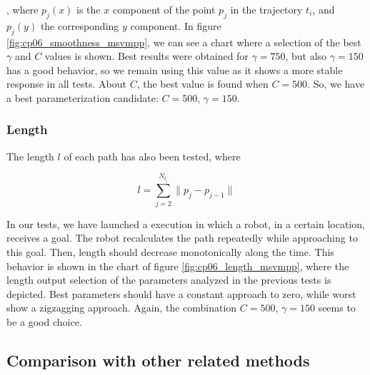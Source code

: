 , where $p_j(x)$ is the $x$ component of the point $p_j$ in the trajectory $t_i$, and $p_j(y)$ the corresponding $y$ component. In figure \ref{fig:cp06_smoothness_msvmpp}, we can see a chart where a selection of the best $\gamma$ and $C$ values is shown. Best results were obtained for $\gamma=750$, but also $\gamma=150$ has a good behavior, so we remain using this value as it shows a more stable response in all tests. About $C$, the best value is found when $C=500$. So, we have a best parameterization candidate: $C=500$, $\gamma=150$.

\subsubsection{Length}\label{ch:chapter06_02_01_03}

The length $l$ of each path has also been tested, where

\begin{equation}\label{eq:cp06_length}
  l = \sum_{j=2}^{N_{t_i}} \| p_j - p_{j - 1}\|
\end{equation}

In our tests, we have launched a execution in which a robot, in a certain location, receives a goal. The robot recalculates the path repeatedly while approaching to this goal. Then, length should decrease monotonically along the time. This behavior is shown in the chart of figure \ref{fig:cp06_length_msvmpp}, where the length output selection of the parameters analyzed in the previous tests is depicted. Best parameters should have a constant approach to zero, while worst show a zigzagging approach. Again, the combination $C=500$, $\gamma=150$ seems to be a good choice.

\subsection{Comparison with other related methods}\label{ch:chapter06_02_02}

